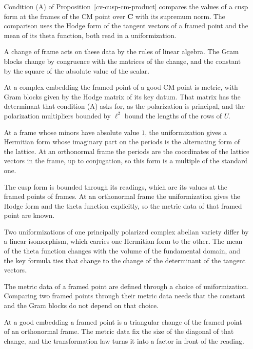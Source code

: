 Condition (A) of Proposition~\ref{cv-cusp-cm-product} compares the values of a cusp form at the frames of the CM
point over $\mathbf C$ with its supremum norm. The comparison uses the Hodge form of the tangent vectors of a
framed point and the mean of its theta function, both read in a uniformization.

A change of frame acts on these data by the rules of linear algebra. The Gram blocks change by congruence with the
matrices of the change, and the constant by the square of the absolute value of the scalar.

At a complex embedding the framed point of a good CM point is metric, with Gram blocks given by the Hodge matrix of
its key datum. That matrix has the determinant that condition (A) asks for, as the polarization is principal, and the
polarization multipliers bounded by $\ell^2$ bound the lengths of the rows of $U$.

At a frame whose minors have absolute value $1$, the uniformization gives a Hermitian form whose imaginary part on the
periods is the alternating form of the lattice. At an orthonormal frame the periods are the coordinates of the lattice
vectors in the frame, up to conjugation, so this form is a multiple of the standard one.

The cusp form is bounded through its readings, which are its values at the framed points of frames. At an orthonormal
frame the uniformization gives the Hodge form and the theta function explicitly, so the metric data of that framed
point are known.

Two uniformizations of one principally polarized complex abelian variety differ by a linear isomorphism, which carries
one Hermitian form to the other. The mean of the theta function changes with the volume of the fundamental domain, and
the key formula ties that change to the change of the determinant of the tangent vectors.

The metric data of a framed point are defined through a choice of uniformization. Comparing two framed points through
their metric data needs that the constant and the Gram blocks do not depend on that choice.

At a good embedding a framed point is a triangular change of the framed point of an orthonormal frame. The metric data
fix the size of the diagonal of that change, and the transformation law turns it into a factor in front of the
reading.

